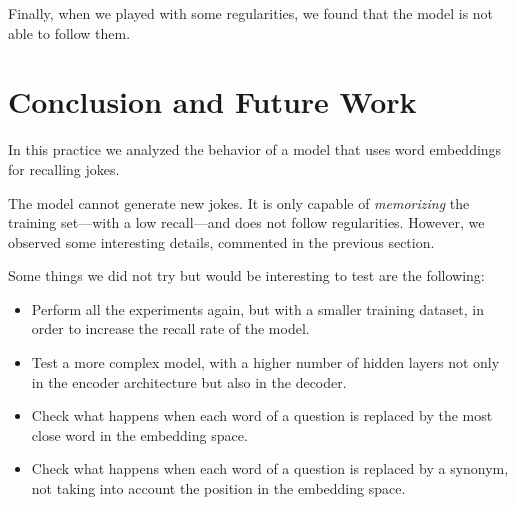 \documentclass[]{article}
\begin{document}
	Finally, when we played with some regularities, we found that the model is not able to follow them.
	
	\section{Conclusion and Future Work}
	
	In this practice we analyzed the behavior of a model that uses word embeddings for recalling jokes.
	
	The model cannot generate new jokes. It is only capable of \emph{memorizing} the training set---with a low recall---and does not follow regularities. However, we observed some interesting details, commented in the previous section.
	
	Some things we did not try but would be interesting to test are the following:
	
	\begin{itemize}
		\item Perform all the experiments again, but with a smaller training dataset, in order to increase the recall rate of the model.
		\item Test a more complex model, with a higher number of hidden layers not only in the encoder architecture but also in the decoder.
		\item Check what happens when each word of a question is replaced by the most close word in the embedding space.
		\item Check what happens when each word of a question is replaced by a synonym, not taking into account the position in the embedding space.
	\end{itemize}
	
	{}
	
\end{document}
